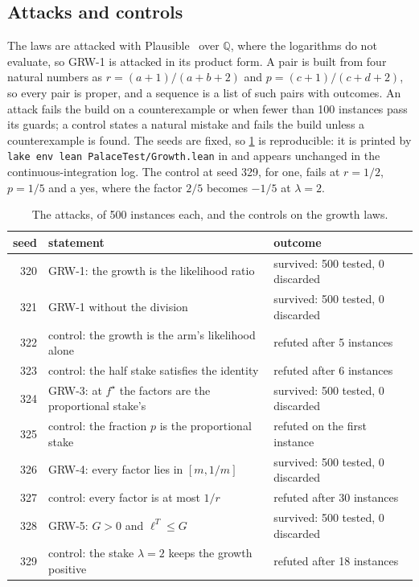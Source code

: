 \documentclass[11pt]{article}
\theoremstyle{plain}
\theoremstyle{definition}
\theoremstyle{remark}
\begin{document}
\subsection{Attacks and controls}

The laws are attacked with Plausible~\citep{plausible} over $\mathbb{Q}$, where the logarithms do
not evaluate, so GRW-1 is attacked in its product form. A pair is built from four
natural numbers as $r=(a+1)/(a+b+2)$ and $p=(c+1)/(c+d+2)$, so every pair is proper, and a sequence
is a list of such pairs with outcomes. An attack fails the build on a counterexample or when fewer
than 100 instances pass its guards; a control states a natural mistake and fails the build unless a
counterexample is found. The seeds are fixed, so \cref{tab:attacks} is reproducible: it is printed
by \texttt{lake env lean PalaceTest/Growth.lean} in  and appears unchanged in the
continuous-integration log. The control at seed 329, for one, fails at $r=1/2$, $p=1/5$ and a yes,
where the factor $2/5$ becomes $-1/5$ at $\lambda=2$.

\begin{table}[t]
\centering
\caption{The attacks, of 500 instances each, and the controls on the growth laws.}
\label{tab:attacks}
\small
\begin{tabular}{rll}
\toprule
seed & statement & outcome \\
\midrule
320 & GRW-1: the growth is the likelihood ratio & survived: 500 tested, 0 discarded \\
321 & GRW-1 without the division & survived: 500 tested, 0 discarded \\
322 & control: the growth is the arm's likelihood alone & refuted after 5 instances \\
323 & control: the half stake satisfies the identity & refuted after 6 instances \\
324 & GRW-3: at $f^\star$ the factors are the proportional stake's & survived: 500 tested,
  0 discarded \\
325 & control: the fraction $p$ is the proportional stake & refuted on the first instance \\
326 & GRW-4: every factor lies in $[m,1/m]$ & survived: 500 tested, 0 discarded \\
327 & control: every factor is at most $1/r$ & refuted after 30 instances \\
328 & GRW-5: $G>0$ and $\ell^T\le G$ & survived: 500 tested, 0 discarded \\
329 & control: the stake $\lambda=2$ keeps the growth positive & refuted after 18 instances \\
\bottomrule
\end{tabular}
\end{table}
\end{document}
